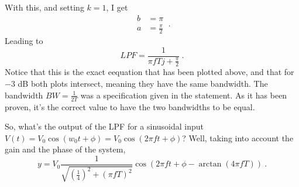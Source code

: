 \noindent With this, and setting $k=1$, I get
\begin{equation}
   \begin{split}
      b &= \pi \\
      a &= \frac{\pi}{2}
   \end{split} \ .
\end{equation}
\noindent Leading to 
\begin{equation}
   LPF = \frac{1}{\pi f T j + \frac{\pi}{2}} \ .
\end{equation}
\noindent Notice that this is the exact eequation that has been plotted above, and that for $-3$ dB both plots intersect, meaning they have the same bandwidth. The bandwidth $BW = \frac{1}{2 T}$ was a specification given in the statement. As it has been proven, it's the correct value to have the two bandwidths to be equal.



\noindent So, what's the output of the LPF for a sinusoidal input $V(t) = V_0 \cos(w_0 t + \phi) =  V_0 \cos(2 \pi f t + \phi)$? Well, taking into account the gain and the phase of the system,
\begin{equation}
   y = V_0 \frac{1}{\sqrt{ \left(\frac{1}{4} \right)^2 + (\pi f T)^2}} \cos \left(  2 \pi f t + \phi - \arctan \left( 4 \pi f T \right) \right) \ .
\end{equation}



